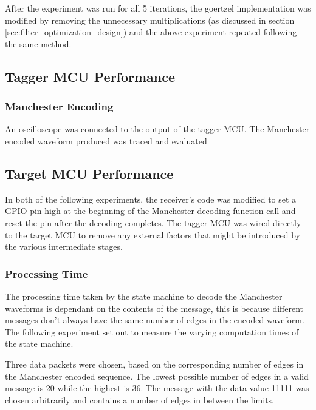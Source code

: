After the experiment was run for all 5 iterations, the goertzel implementation was modified by removing the unnecessary multiplications (as discussed in section \ref{sec:filter_optimization_design}) and the above experiment repeated following the same method.







\subsection{Tagger MCU Performance}

\subsubsection{Manchester Encoding}

An oscilloscope was connected to the output of the tagger MCU. The Manchester encoded waveform produced was traced and evaluated 








\subsection{Target MCU Performance}

In both of the following experiments, the receiver's code was modified to set a GPIO pin high at the beginning of the Manchester decoding function call and reset the pin after the decoding completes. The tagger MCU was wired directly to the target MCU to remove any external factors that might be introduced by the various intermediate stages.

\subsubsection{Processing Time}
The processing time taken by the state machine to decode the Manchester waveforms is dependant on the contents of the message, this is because different messages don't always have the same number of edges in the encoded waveform. The following experiment set out to measure the varying computation times of the state machine.

Three data packets were chosen, based on the corresponding number of edges in the Manchester encoded sequence. The lowest possible number of edges in a valid message is 20 while the highest is 36. The message with the data value 11111 was chosen arbitrarily and contains a number of edges in between the limits.

